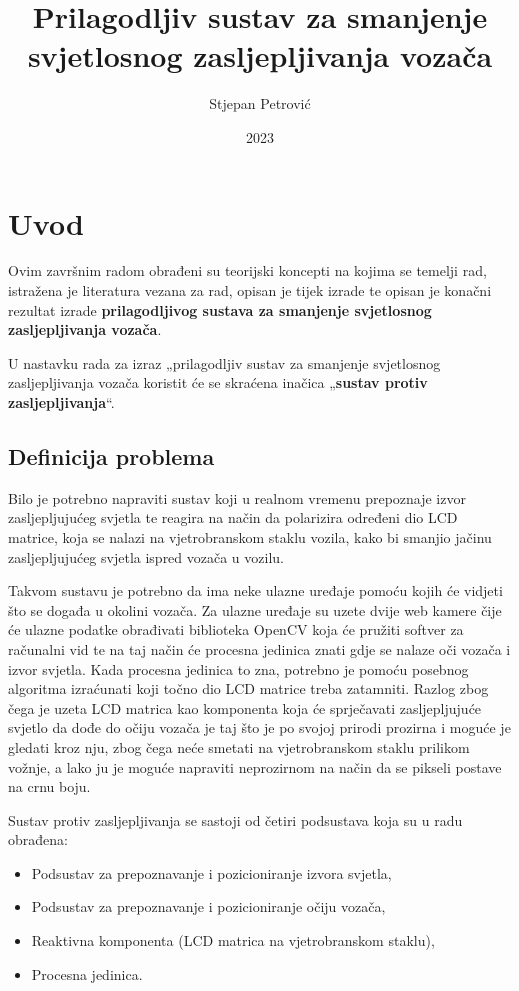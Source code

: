 \documentclass{foi}
\title{Prilagodljiv sustav za smanjenje svjetlosnog zasljepljivanja vozača}
\author{Stjepan Petrović}
\date{2023}
\begin{document}
\maketitle

\tableofcontents

\pagestyle{plain}
\chapter{Uvod}

Ovim završnim radom obrađeni su teorijski koncepti na kojima se temelji rad, istražena je literatura vezana za rad, opisan je tijek izrade te opisan je konačni rezultat izrade \textbf{prilagodljivog sustava za smanjenje svjetlosnog zasljepljivanja vozača}.

U nastavku rada za izraz „prilagodljiv sustav za smanjenje svjetlosnog zasljepljivanja vozača koristit će se skraćena inačica „\textbf{sustav protiv zasljepljivanja}“.

\section{Definicija problema}

 Bilo je potrebno napraviti sustav koji u realnom vremenu prepoznaje izvor zasljepljujućeg svjetla te reagira na način da polarizira određeni dio LCD matrice, koja se nalazi na vjetrobranskom staklu vozila, kako bi smanjio jačinu zasljepljujućeg svjetla ispred vozača u vozilu.

 Takvom sustavu je potrebno da ima neke ulazne uređaje pomoću kojih će vidjeti što se događa u okolini vozača. Za ulazne uređaje su uzete dvije web kamere čije će ulazne podatke obrađivati biblioteka OpenCV koja će pružiti softver za računalni vid te na taj način će procesna jedinica znati gdje se nalaze oči vozača i izvor svjetla. Kada procesna jedinica to zna, potrebno je pomoću posebnog algoritma izraćunati koji točno dio LCD matrice treba zatamniti. Razlog zbog čega je uzeta LCD matrica kao komponenta koja će sprječavati zasljepljujuće svjetlo da dođe do očiju vozača je taj što je po svojoj prirodi prozirna i moguće je gledati kroz nju, zbog čega neće smetati na vjetrobranskom staklu prilikom vožnje, a lako ju je moguće napraviti neprozirnom na način da se pikseli postave na crnu boju.

\begin{flushleft}Sustav protiv zasljepljivanja se sastoji od četiri podsustava koja su u radu obrađena:\end{flushleft}
\begin{itemize}[noitemsep]
    \item Podsustav za prepoznavanje i pozicioniranje izvora svjetla,
    \item Podsustav za prepoznavanje i pozicioniranje očiju vozača,
    \item Reaktivna komponenta (LCD matrica na vjetrobranskom staklu),
    \item Procesna jedinica.
\end{itemize}
\end{document}
